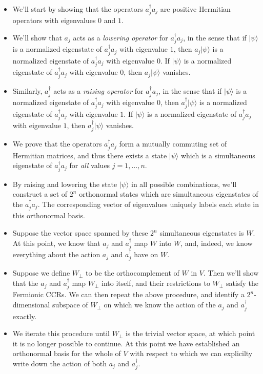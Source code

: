 \documentclass[12pt]{article}
\begin{document}
\begin{itemize}
\item We'll start by showing that the operators $a_j^\dagger a_j$ are
  positive Hermitian operators with eigenvalues $0$ and $1$.
  
\item We'll show that $a_j$ acts as a \emph{lowering operator} for
  $a_j^\dagger a_j$, in the sense that if $|\psi\rangle$ is a
  normalized eigenstate of $a_j^\dagger a_j$ with eigenvalue $1$, then
  $a_j |\psi\rangle$ is a normalized eigenstate of $a_j^\dagger a_j$
  with eigenvalue $0$.  If $|\psi\rangle$ is a normalized eigenstate
  of $a_j^\dagger a_j$ with eigenvalue $0$, then $a_j |\psi\rangle$
  vanishes.
  
\item Similarly, $a_j^\dagger$ acts as a \emph{raising operator} for
  $a_j^\dagger a_j$, in the sense that if $|\psi\rangle$ is a
  normalized eigenstate of $a_j^\dagger a_j$ with eigenvalue $0$, then
  $a_j^\dagger |\psi\rangle$ is a normalized eigenstate of
  $a_j^\dagger a_j$ with eigenvalue $1$.  If $|\psi\rangle$ is a
  normalized eigenstate of $a_j^\dagger a_j$ with eigenvalue $1$, then
  $a_j^\dagger |\psi\rangle$ vanishes.

  
\item We prove that the operators $a_j^\dagger a_j$ form a mutually
  commuting set of Hermitian matrices, and thus there exists a state
  $|\psi\rangle$ which is a simultaneous eigenstate of $a_j^\dagger
  a_j$ for \emph{all} values $j=1,\ldots,n$.
  
\item By raising and lowering the state $|\psi\rangle$ in all possible
  combinations, we'll construct a set of $2^n$ orthonormal states
  which are simultaneous eigenstates of the $a_j^\dagger a_j$.  The
  corresponding vector of eigenvalues uniquely labels each state in
  this orthonormal basis.
  
\item Suppose the vector space spanned by these $2^n$ simultaneous
  eigenstates is $W$.  At this point, we know that $a_j$ and
  $a_j^\dagger$ map $W$ into $W$, and, indeed, we know everything
  about the action $a_j$ and $a_j^\dagger$ have on $W$.
  
\item Suppose we define $W_\perp$ to be the orthocomplement of $W$ in
  $V$.  Then we'll show that the $a_j$ and $a_j^\dagger$ map $W_\perp$
  into itself, and their restrictions to $W_\perp$ satisfy the
  Fermionic CCRs.  We can then repeat the above procedure, and
  identify a $2^n$-dimensional subspace of $W_\perp$ on which we know
  the action of the $a_j$ and $a_j^\dagger$ exactly.
  
\item We iterate this procedure until $W_\perp$ is the trivial vector
  space, at which point it is no longer possible to continue.  At this
  point we have established an orthonormal basis for the whole of $V$
  with respect to which we can explicilty write down the action of both
  $a_j$ and $a_j^\dagger$.
\end{itemize}
\end{document}
